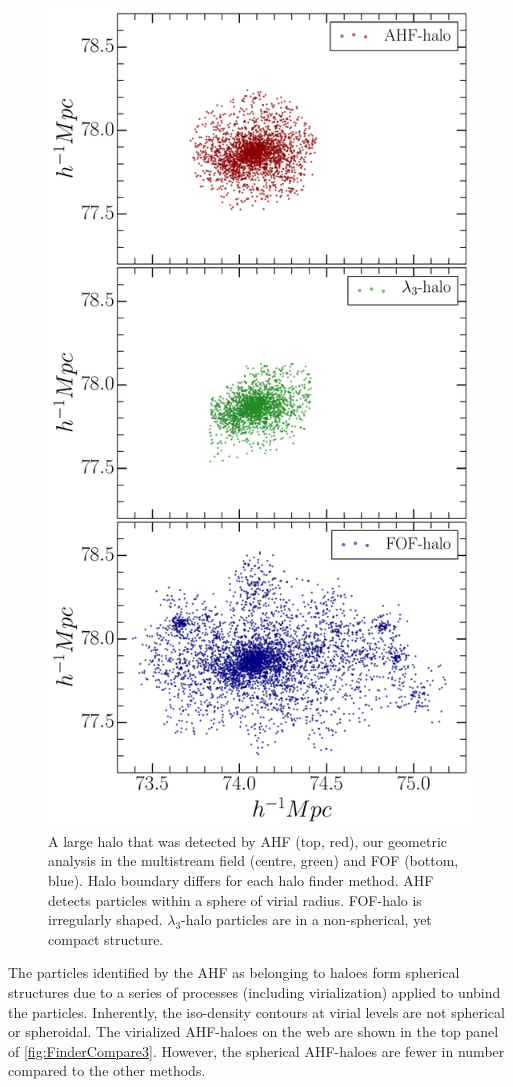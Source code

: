 \documentclass[fleqn,usenatbib,useAMS]{mnras}
\begin{document}
\begin{figure}
\begin{minipage}[t]{.99\linewidth}
 \centering
 \includegraphics[width=8.cm]{fig11.pdf}
\end{minipage}\hfill
\caption{A large halo that was detected by AHF (top, red), our geometric analysis in the multistream field (centre, green) and FOF (bottom, blue). Halo boundary differs for each halo finder method. AHF detects particles within a sphere of virial radius. FOF-halo is irregularly shaped. $\lambda_3$-halo particles are in a non-spherical, yet compact structure. }
\label{fig:FinderCompareAll}
\end{figure}



The particles identified by the AHF as belonging to haloes form spherical structures due to a series of processes (including virialization) applied to unbind the particles. Inherently, the iso-density contours at virial levels are not spherical or spheroidal. The virialized AHF-haloes on the web are shown in the top panel of \autoref{fig:FinderCompare3}. However, the spherical AHF-haloes are fewer in number compared to the other methods. 
\end{document}
